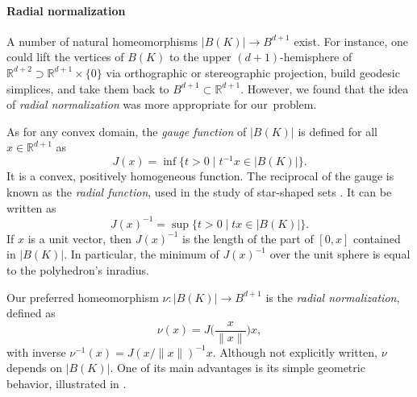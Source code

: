 \documentclass[a4paper,english,cleveref,autoref,thm-restate,nolineno]{socg-lipics-v2021}
\newcommand{\R}{\mathbb R}
\newcommand{\geomreal}[1] { |#1| } %
\newcommand{\sect}[1] { \mathrm{Sect}(#1) } %
\newif\iffullversion
\newcommand{\fullonly}[1]{\iffullversion #1\fi}
\begin{document}
\paragraph*{Radial normalization}

A number of natural homeomorphisms $\geomreal{B(K)}\to B^{d+1}$ exist.
For instance, one could lift the vertices of $B(K)$ to the upper $(d+1)$-hemisphere of $\R^{d+2}\supset\R^{d+1}\times\{0\}$ via orthographic or stereographic projection, build geodesic simplices, and take them back to $B^{d+1}\subset\R^{d+1}$.
However, we found that the idea of \emph{radial normalization} was more appropriate for our~problem.

As for any convex domain, the \emph{gauge function} of $\geomreal{B(K)}$ is defined for all $x\in \R^{d+1}$ as 
\[
J(x) = \inf\{t>0\mid t^{-1} x \in \geomreal{B(K)}\}.
\]
It is a convex, positively homogeneous function.
The reciprocal of the gauge is known as the \emph{radial function}, used in the study of star-shaped sets \cite{hansen2020starshaped}.
It can be written as
\[
J(x)^{-1} = \sup\{t>0\mid t x \in \geomreal{B(K)}\}.
\]
If $x$ is a unit vector, then $J(x)^{-1}$ is the length of the part of $[0,x]$ contained in $\geomreal{B(K)}$.
In particular, the minimum of $J(x)^{-1}$ over the unit sphere is equal to the polyhedron's inradius.

Our preferred homeomorphism $\nu\colon\geomreal{B(K)}\to B^{d+1}$ is the \textit{radial normalization}, defined as
\[
\nu(x) = J\bigg(\frac{x}{\|x\|}\bigg)x,
\]
with inverse $\nu^{-1}(x) = J(x/\|x\|)^{-1}x$.
Although not explicitly written, $\nu$ depends on $\geomreal{B(K)}$.
One of its main advantages is its simple geometric behavior, illustrated in .

\fullonly{
\begin{lemma}[%
	name={proof p.~\pageref{proof:apothemnormalization}},%
	restate=apothemnormalization%
	]
	\label{lem:apothemnormalization}
	Under inverse radial normalization $\nu^{-1}\colon B^{d+1}\to \geomreal{B(K)}$,
	\begin{itemize}
		\item 
		rays through the origin are mapped to rays through the origin;
		\item 
		circular arcs---i.e., intersections of planes with spheres centered at the origin---are mapped to paths which are linear in each sector $\geomreal{\sect{\sigma}}\subset\geomreal{B(K)}$ and parallel to $\geomreal{\sigma}$.
	\end{itemize}
\end{lemma}
}
\end{document}
